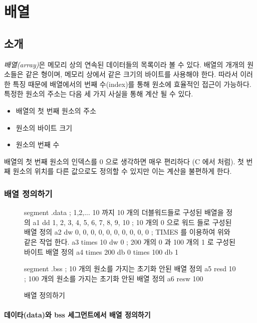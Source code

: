 ﻿%
\chapter{배열}
\section{소개}

\emph{배열(array)}은 메모리 상의 연속된 데이터들의 목록이라 볼 수 있다. 
배열의 개개의 원소들은 같은 형이며, 메모리 상에서 같은 크기의
바이트를 사용해야 한다. 따라서 이러한 특징 때문에 배열에서의 번째 수(index)를 통해 원소에
효율적인 접근이 가능하다. 특정한 원소의 주소는 다음 세 가지 사실을 통해 계산 될 수 있다. 

\begin{itemize}
\item 배열의 첫 번째 원소의 주소
\item 원소의 바이트 크기
\item 원소의 번째 수
\end{itemize}

배열의 첫 번째 원소의 인덱스를 0 으로 생각하면 매우 편리하다 (C 에서 처럼). 
첫 번째 원소의 위치를 다른 값으로도 정의할 수 있지만 이는 계산을 불편하게 한다. 

\subsection{배열 정의하기}

\begin{figure}[t]
\begin{AsmCodeListing}[frame=single]
segment .data
; 1,2,... 10 까지 10 개의 더블워드들로 구성된 배열을 정의
a1           dd   1, 2, 3, 4, 5, 6, 7, 8, 9, 10
; 10 개의 0 으로 워드 들로 구성된 배열 정의 
a2           dw   0, 0, 0, 0, 0, 0, 0, 0, 0, 0
; TIMES 를 이용하여 위와 같은 작업 한다. 
a3           times 10 dw 0
; 200 개의 0 과 100 개의 1 로 구성된 바이트 배열 정의
a4           times 200 db 0
             times 100 db 1

segment .bss
; 10 개의 원소를 가지는 초기화 안된 배열 정의
a5           resd  10
; 100 개의 원소를 가지는 초기화 안된 배열 정의
a6           resw  100
\end{AsmCodeListing}
\caption{배열 정의하기\label{fig:DataArrays}}
\end{figure}

\subsubsection{데이타{\code (data)}와 {\code bss} 세그먼트에서 배열 정의하기}

